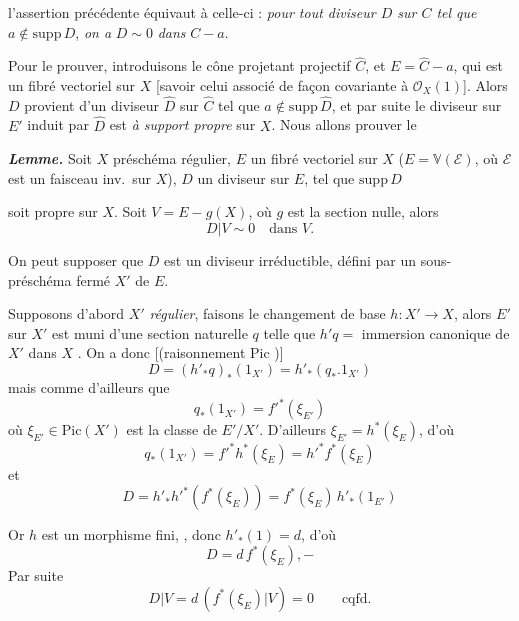 \documentclass[11pt,a4paper]{article}
\begin{document}
l'assertion précédente équivaut à celle-ci : \emph{pour tout diviseur $D$ sur
$C$ tel que} $a \notin \mathrm{supp}\, D$, \emph{on a} $D \sim 0$ \emph{dans} $C - a$.

Pour le prouver, introduisons le cône projetant projectif $\hat{C}$, et
$E = \hat{C} - a$, qui est un fibré vectoriel sur $X$ [savoir celui associé de
façon covariante à $\mathcal{O}_X(1)$]. Alors $D$ provient d'un diviseur $\hat{D}$
sur $\hat{C}$ tel que $a \notin \mathrm{supp}\, \hat{D}$, et par suite le
 diviseur  sur $E'$ induit par $\hat{D}$
est \emph{à support propre} sur $X$. Nous allons prouver le

\textbf{\emph{Lemme.}} Soit $X$ préschéma régulier, $E$ un fibré vectoriel
 sur $X$ ($E = \mathbb{V}(\mathcal{E})$, où $\mathcal{E}$ est un
faisceau inv.\ sur $X$), $D$ un diviseur sur $E$, tel que $\mathrm{supp}\, D$

soit propre sur $X$.  Soit $V = E - g(X)$, où $g$ est la section
nulle, alors
\[
  D|V \sim 0 \quad \text{dans } V.
\]


On peut supposer que $D$ est un diviseur irréductible, défini par un
sous-préschéma fermé $X'$ de $E$. 

Supposons d'abord $X'$ \emph{régulier}, faisons le changement de base
$h \colon X' \to X$, alors $E'$ sur $X'$ est muni d'une section naturelle $q$
telle que $h'q =$ immersion canonique de $X'$ dans $X$
. On a donc 
[(raisonnement \ill{}  $\mathrm{Pic}$ \ill{})]
\[
  D = (h'_* q)_* (1_{X'}) = h'_*(q_*.1_{X'})
\]
mais comme d'ailleurs que
\[
  q_*(1_{X'}) = f'^*(\xi_{E'})
\]
où $\xi_{E'} \in \mathrm{Pic}(X')$ est la classe \ill{} de $E'/X'$. D'ailleurs
$\xi_{E'} = h^*(\xi_E)$, d'où
\[
  q_*(1_{X'}) = f'^* h^*(\xi_E) = h'^* f^*(\xi_E)
\]
et
\[
  D = h'_* h'^*(f^*(\xi_E)) = f^*(\xi_E)\, h'_*(1_{E'})
\]

Or $h$ est un morphisme fini, 
\struck{\ill{}}, donc $h'_*(1) = d$, d'où
\[
  D = d\, f^*(\xi_E), -
\]
Par suite
\[
  D|V = d\,(f^*(\xi_E)|V) = 0 \qquad \text{cqfd.}
\]
\end{document}
